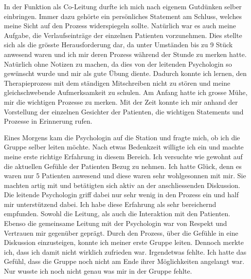 \documentclass[jou,apacite]{apa6}
\begin{document}
In der Funktion als Co-Leitung durfte ich mich nach eigenem Gutdünken selber einbringen. Immer dazu gehörte ein persönliches Statement am Schluss, welches meine Sicht auf den Prozess widerspiegeln sollte. Natürlich war es auch meine Aufgabe, die Verlaufseinträge der einzelnen Patienten vorzunehmen. Dies stellte sich als die grösste Herausforderung dar, da unter Umständen bis zu 9 Stück anwesend waren und ich mir deren Prozess während der Stunde zu merken hatte. Natürlich ohne Notizen zu machen, da dies von der leitenden Psychologin so gewünscht wurde und mir als gute Übung diente. Dadurch konnte ich lernen, den Therapieprozess mit dem ständigen Mitschreiben nicht zu stören und meine gleichschwebende Aufmerksamkeit zu schulen. Am Anfang hatte ich grosse Mühe, mir die wichtigen Prozesse zu merken. Mit der Zeit konnte ich mir anhand der Vorstellung der einzelnen Gesichter der Patienten, die wichtigen Statements und Prozesse in Erinnerung rufen. 

Eines Morgens kam die Psychologin auf die Station und fragte mich, ob ich die Gruppe selber leiten möchte. Nach etwas Bedenkzeit willigte ich ein und machte meine erste richtige Erfahrung in diesem Bereich. Ich versuchte wie gewohnt auf die aktuellen Gefühle der Patienten Bezug zu nehmen. Ich hatte Glück, denn es waren nur 5 Patienten anwesend und diese waren sehr wohlgesonnen mit mir. Sie machten artig mit und betätigten sich aktiv an der anschliessenden Diskussion. Die leitende Psychologin griff dabei nur sehr wenig in den Prozess ein und half mir unterstützend dabei. Ich habe diese Erfahrung als sehr bereichernd empfunden. Sowohl die Leitung, als auch die Interaktion mit den Patienten. Ebenso die gemeinsame Leitung mit der Psychologin war von Respekt und Vertrauen mir gegenüber geprägt. Durch den Prozess, über die Gefühle in eine Diskussion einzusteigen, konnte ich meiner erste Gruppe leiten. Dennoch merkte ich, dass ich damit nicht wirklich zufrieden war. Irgendetwas fehlte. Ich hatte das Gefühl, dass die Gruppe noch nicht am Ende ihrer Möglichkeiten angelangt war. Nur wusste ich noch nicht genau was mir in der Gruppe fehlte. 
\end{document}
